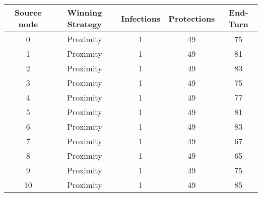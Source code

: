 \documentclass[results.tex]{subfiles}
\begin{document}
    \begin{center}
        \begin{tabular}{| c || c | c | c | c |}
            \hline
            {\bfseries Source node} & {\bfseries Winning Strategy} & {\bfseries Infections} & {\bfseries Protections}
            & {\bfseries End-Turn}
            \\  %
            \hline\hline
            0                       & Proximity                    & 1                      & 49                      & 75                   \\
            \hline
            1                       & Proximity                    & 1                      & 49                      & 81                   \\
            \hline
            2                       & Proximity                    & 1                      & 49                      & 83                   \\
            \hline
            3                       & Proximity                    & 1                      & 49                      & 75                   \\
            \hline
            4                       & Proximity                    & 1                      & 49                      & 77                   \\
            \hline
            5                       & Proximity                    & 1                      & 49                      & 81                   \\
            \hline
            6                       & Proximity                    & 1                      & 49                      & 83                   \\
            \hline
            7                       & Proximity                    & 1                      & 49                      & 67                   \\
            \hline
            8                       & Proximity                    & 1                      & 49                      & 65                   \\
            \hline
            9                       & Proximity                    & 1                      & 49                      & 75                   \\
            \hline
            10                      & Proximity                    & 1                      & 49                      & 85                   \\

\end{tabular}
\end{center}
\end{document}
